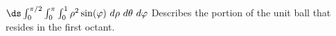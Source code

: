 {
$\ds \int_0^{\pi/2}\int_0^{\pi}\int_0^{1} \rho^2\sin(\varphi)\ d\rho\ d\theta\ d\varphi$
}
{Describes the portion of the unit ball that resides in the first octant.
}
